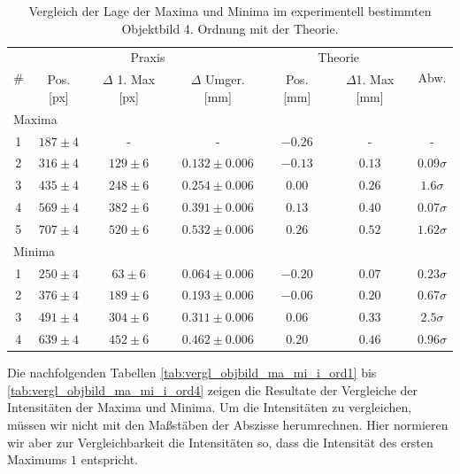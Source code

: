\begin{table}[H]
  \centering
  \caption{Vergleich der Lage der Maxima und Minima im experimentell bestimmten Objektbild 4. Ordnung mit der Theorie.}
  \vspace*{0.5em}
  \begin{tabular}{|c|c|c|c|c|c|c|}\hline
    \multirow{2}{*}{\#} & \multicolumn{3}{c|}{Praxis} & \multicolumn{2}{c|}{Theorie} & \multirow{2}{*}{Abw.}\\\cline{2-6}
        & Pos. [px] & $\Delta$ 1. Max [px] & $\Delta$ Umger. [mm] & Pos. [mm] & $\Delta$1. Max [mm] & \\\hline
    \multicolumn{7}{|l|}{Maxima}\\\hline
    1   & $187 \pm 4$ & -                 & -             & $-0.26$ & -                 & - \\
    2   & $316 \pm 4$ & $129 \pm 6$ & $0.132 \pm 0.006$ & $-0.13$ & $0.13$ & $0.09\sigma$\\
    3   & $435 \pm 4$ & $248 \pm 6$ & $0.254 \pm 0.006$ & $0.00$ & $0.26$ & $1.6\sigma$\\
    4   & $569 \pm 4$ & $382 \pm 6$ & $0.391 \pm 0.006$ & $0.13$ & $0.40$ & $0.07\sigma$\\
    5   & $707 \pm 4$ & $520 \pm 6$ & $0.532 \pm 0.006$ & $0.26$ & $0.52$ & $1.62\sigma$\\\hline
    \multicolumn{7}{|l|}{Minima}\\\hline
    1   & $250 \pm 4$ & $63 \pm 6$  & $0.064 \pm 0.006$ & $-0.20$ & $0.07$ & $0.23\sigma$\\
    2   & $376 \pm 4$ & $189 \pm 6$ & $0.193 \pm 0.006$ & $-0.06$ & $0.20$ & $0.67\sigma$\\
    3   & $491 \pm 4$ & $304 \pm 6$ & $0.311 \pm 0.006$ & $0.06$  & $0.33$ & $2.5\sigma$\\
    4   & $639 \pm 4$ & $452 \pm 6$ & $0.462 \pm 0.006$ & $0.20$ & $0.46$ & $0.96\sigma$\\\hline
  \end{tabular}
  \label{tab:vergl_objbild_ma_mi_x_ord4}
\end{table}

\newpage

Die nachfolgenden Tabellen \ref{tab:vergl_objbild_ma_mi_i_ord1} bis \ref{tab:vergl_objbild_ma_mi_i_ord4} zeigen die Resultate der Vergleiche der Intensitäten der Maxima und Minima. Um die Intensitäten zu vergleichen, müssen wir nicht mit den Maßstäben der Abszisse herumrechnen. Hier normieren wir aber zur Vergleichbarkeit die Intensitäten so, dass die Intensität des ersten Maximums $1$ entspricht.

